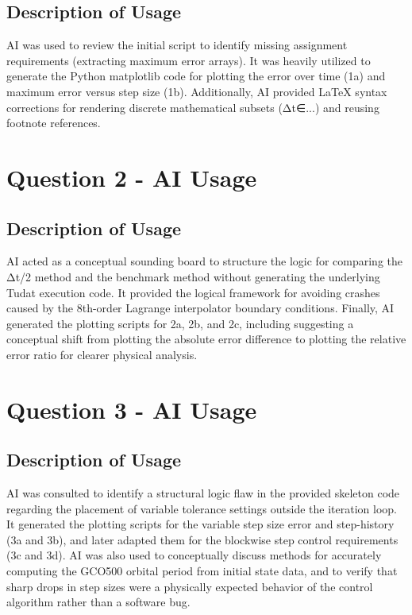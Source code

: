 \documentclass[a4paper,12pt]{article}
\begin{document}
\subsection*{Description of Usage}
AI was used to review the initial script to identify missing assignment requirements (extracting maximum error arrays). It was heavily utilized to generate the Python matplotlib code for plotting the error over time (1a) and maximum error versus step size (1b). Additionally, AI provided LaTeX syntax corrections for rendering discrete mathematical subsets (Δt∈{...}) and reusing footnote references.

\section*{Question 2 - AI Usage}

\subsection*{Description of Usage}
AI acted as a conceptual sounding board to structure the logic for comparing the Δt/2 method and the benchmark method without generating the underlying Tudat execution code. It provided the logical framework for avoiding crashes caused by the 8th-order Lagrange interpolator boundary conditions. Finally, AI generated the plotting scripts for 2a, 2b, and 2c, including suggesting a conceptual shift from plotting the absolute error difference to plotting the relative error ratio for clearer physical analysis.

\section*{Question 3 - AI Usage}

\subsection*{Description of Usage}
AI was consulted to identify a structural logic flaw in the provided skeleton code regarding the placement of variable tolerance settings outside the iteration loop. It generated the plotting scripts for the variable step size error and step-history (3a and 3b), and later adapted them for the blockwise step control requirements (3c and 3d). AI was also used to conceptually discuss methods for accurately computing the GCO500 orbital period from initial state data, and to verify that sharp drops in step sizes were a physically expected behavior of the control algorithm rather than a software bug.
\end{document}
